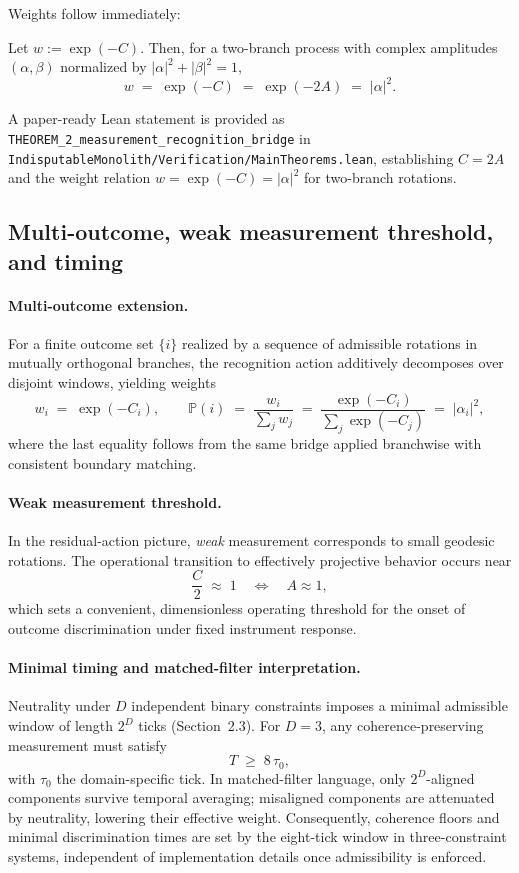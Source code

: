 \documentclass[12pt,a4paper]{article}
\begin{document}
Weights follow immediately:

\begin{corollary}\label{cor:Born}
Let $w:=\exp(-C)$. Then, for a two-branch process with complex amplitudes $(\alpha,\beta)$ normalized by $|\alpha|^{2}+|\beta|^{2}=1$,
\[
  w \;=\; \exp(-C) \;=\; \exp(-2A) \;=\; |\alpha|^{2}.
\]
\end{corollary}

\begin{remark}
A paper-ready Lean statement is provided as \texttt{THEOREM\_2\_measurement\_recognition\_bridge} in \texttt{IndisputableMonolith/Verification/MainTheorems.lean}, establishing $C=2A$ and the weight relation $w=\exp(-C)=|\alpha|^{2}$ for two-branch rotations.
\end{remark}

\subsection{Multi-outcome, weak measurement threshold, and timing}
\paragraph{Multi-outcome extension.}
For a finite outcome set $\{i\}$ realized by a sequence of admissible rotations in mutually orthogonal branches, the recognition action additively decomposes over disjoint windows, yielding weights
\[
  w_i \;=\; \exp(-C_i), 
  \qquad 
  \mathbb{P}(i)\;=\;\frac{w_i}{\sum_j w_j}
  \;=\;\frac{\exp(-C_i)}{\sum_j \exp(-C_j)}
  \;=\;|\alpha_i|^{2},
\]
where the last equality follows from the same bridge applied branchwise with consistent boundary matching.

\paragraph{Weak measurement threshold.}
In the residual-action picture, \emph{weak} measurement corresponds to small geodesic rotations. The operational transition to effectively projective behavior occurs near
\[
  \frac{C}{2}\;\approx\;1 \quad\Longleftrightarrow\quad A\approx 1,
\]
which sets a convenient, dimensionless operating threshold for the onset of outcome discrimination under fixed instrument response.

\paragraph{Minimal timing and matched-filter interpretation.}
Neutrality under $D$ independent binary constraints imposes a minimal admissible window of length $2^{D}$ ticks (Section~2.3). For $D=3$, any coherence-preserving measurement must satisfy
\[
  T \;\ge\; 8\,\tau_{0},
\]
with $\tau_{0}$ the domain-specific tick. In matched-filter language, only $2^{D}$-aligned components survive temporal averaging; misaligned components are attenuated by neutrality, lowering their effective weight. Consequently, coherence floors and minimal discrimination times are set by the eight-tick window in three-constraint systems, independent of implementation details once admissibility is enforced.
\end{document}
